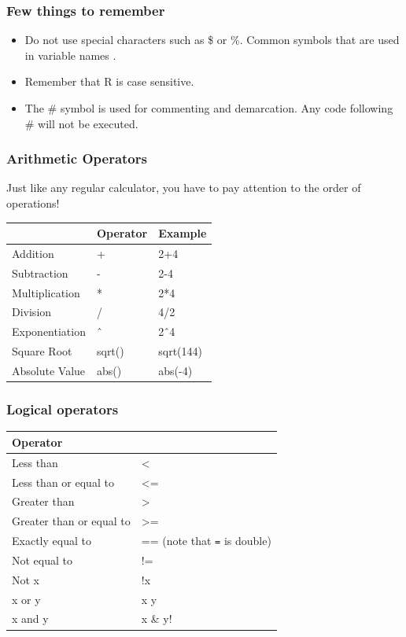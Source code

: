 \documentclass[
]{article}
\providecommand{\tightlist}{%
  \setlength{\itemsep}{0pt}\setlength{\parskip}{0pt}}
\begin{document}
\hypertarget{few-things-to-remember}{%
\subsubsection{Few things to remember}\label{few-things-to-remember}}

\begin{itemize}
\tightlist
\item
  Do not use special characters such as \$ or \%. Common symbols that
  are used in variable names .
\item
  Remember that R is case sensitive.
\item
  The \# symbol is used for commenting and demarcation. Any code
  following \# will not be executed.
\end{itemize}

\hypertarget{arithmetic-operators}{%
\subsubsection{Arithmetic Operators}\label{arithmetic-operators}}

Just like any regular calculator, you have to pay attention to the order
of operations!

\begin{longtable}[]{@{}lll@{}}
\toprule\noalign{}
& Operator & Example \\
\midrule\noalign{}
\endhead
\bottomrule\noalign{}
\endlastfoot
Addition & + & 2+4 \\
Subtraction & - & 2-4 \\
Multiplication & * & 2*4 \\
Division & / & 4/2 \\
Exponentiation & ˆ & 2ˆ4 \\
Square Root & sqrt() & sqrt(144) \\
Absolute Value & abs() & abs(-4) \\
\end{longtable}

\hypertarget{logical-operators}{%
\subsubsection{Logical operators}\label{logical-operators}}

\begin{longtable}[]{@{}ll@{}}
\toprule\noalign{}
Operator & \\
\midrule\noalign{}
\endhead
\bottomrule\noalign{}
\endlastfoot
Less than & \textless{} \\
Less than or equal to & \textless= \\
Greater than & \textgreater{} \\
Greater than or equal to & \textgreater= \\
Exactly equal to & == (note that \texttt{=} is double) \\
Not equal to & != \\
Not x & !x \\
x or y & x y \\
x and y & x \& y! \\
\end{longtable}
\end{document}
